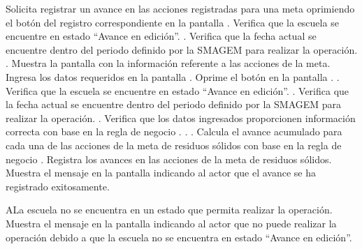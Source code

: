  \begin{UCtrayectoria}
    \UCpaso[\UCactor] Solicita registrar un avance en las acciones registradas para una meta oprimiendo el botón \botAutoAjus del registro correspondiente en la pantalla .
    \UCpaso[\UCsist] Verifica que la escuela se encuentre en estado ``Avance en edición''. .
    \UCpaso[\UCsist] Verifica que la fecha actual se encuentre dentro del periodo definido por la SMAGEM para realizar la operación. .    
    \UCpaso[\UCsist] Muestra la pantalla  con la información referente a las acciones de la meta. 
    \UCpaso[\UCactor] Ingresa los datos requeridos en la pantalla . \label{cus27:RegAvanceAgua}
    \UCpaso[\UCactor] Oprime el botón  en la pantalla . . 
    \UCpaso[\UCsist] Verifica que la escuela se encuentre en estado ``Avance en edición''. .
    \UCpaso[\UCsist] Verifica que la fecha actual se encuentre dentro del periodo definido por la SMAGEM para realizar la operación. .
    \UCpaso[\UCsist] Verifica que los datos ingresados proporcionen información correcta con base en la regla de negocio .  . .    
    \UCpaso[\UCsist] Calcula el avance acumulado para cada una de las acciones de la meta de residuos sólidos con base en la regla de negocio .
    \UCpaso[\UCsist] Registra los avances en las acciones de la meta de residuos sólidos.
    \UCpaso[\UCsist] Muestra el mensaje  en la pantalla  indicando al actor que el avance se ha registrado exitosamente.
 \end{UCtrayectoria}
 

     \begin{UCtrayectoriaA}{A}{La escuela no se encuentra en un estado que permita realizar la operación.}
	\UCpaso[\UCsist] Muestra el mensaje  en la pantalla  indicando al actor que no puede realizar la operación debido a que la escuela no se encuentra en estado ``Avance en edición''. 
    \end{UCtrayectoriaA}
 
